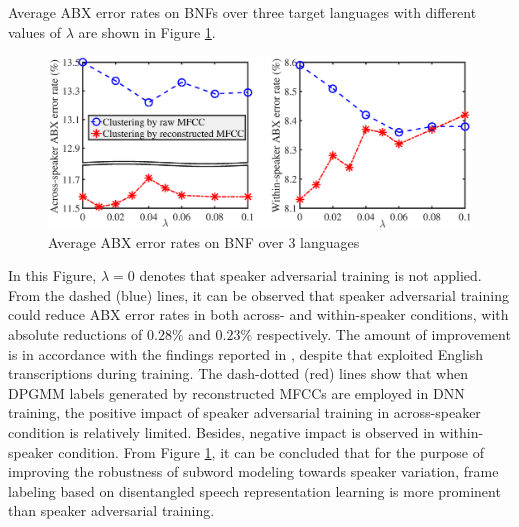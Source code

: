 \documentclass[a4paper]{article}
\begin{document}
Average ABX error rates on BNFs over three target languages with different values of $\lambda$ are shown in Figure \ref{fig:amtl}. 
\begin{figure}[t]
    \centering
    \includegraphics[width = 1\linewidth]{adv_results2_breakyaxis_export_setup.eps}
    \caption{Average ABX error rates on BNF over $3$ languages }
    \label{fig:amtl}
\end{figure}
In this Figure, $\lambda=0$ denotes that  speaker adversarial training is not applied. 
From the dashed (blue) lines, it can be observed that speaker adversarial training could reduce ABX error rates in both across- and within-speaker conditions, with absolute reductions of $0.28\%$ and $0.23\%$ respectively. The amount of  improvement is in accordance with the findings reported in \cite{Tsuchiya2018speaker}, despite that  \cite{Tsuchiya2018speaker} exploited English transcriptions during training.
The dash-dotted (red) lines show that when  DPGMM labels generated by reconstructed MFCCs are employed in DNN training, the  positive impact of speaker adversarial training in  across-speaker condition is relatively limited. 
Besides, negative impact is observed in within-speaker condition.
From  Figure \ref{fig:amtl}, it can be concluded  that 
for the purpose of improving the robustness of subword modeling towards speaker variation, frame labeling based on disentangled speech representation learning is more prominent than speaker adversarial training.
\end{document}
